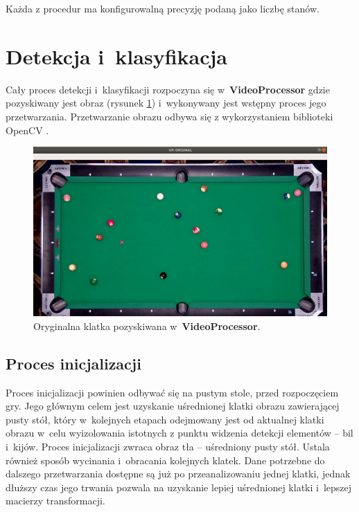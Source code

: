 \documentclass[12pt]{article}
\begin{document}
Każda z procedur ma konfigurowalną precyzję podaną jako liczbę stanów.

\section{Detekcja i~klasyfikacja}

Cały proces detekcji i~klasyfikacji rozpoczyna się w~\textbf{VideoProcessor} gdzie pozyskiwany jest obraz (rysunek \ref{vp_original}) i~wykonywany jest wstępny proces jego przetwarzania. Przetwarzanie obrazu odbywa się z wykorzystaniem biblioteki OpenCV \cite{OpenCV}.

\begin{figure}[!htb]
    \centering
    \includegraphics[width=15cm]{./images/obrazki/vp/original.png}
    \caption{Oryginalna klatka pozyskiwana w~\textbf{VideoProcessor}.}
    \label{vp_original}
\end{figure}

\subsection{Proces inicjalizacji}

Proces inicjalizacji powinien odbywać się na pustym stole, przed rozpoczęciem gry. Jego głównym celem jest uzyskanie uśrednionej klatki obrazu zawierającej pusty stół, który w~kolejnych etapach odejmowany jest od aktualnej klatki obrazu w~celu wyizolowania istotnych z punktu widzenia detekcji elementów – bil i~kijów. Proces inicjalizacji zwraca obraz tła – uśredniony pusty stół. Ustala również sposób wycinania i~obracania kolejnych klatek. Dane potrzebne do dalszego przetwarzania dostępne są już po przeanalizowaniu jednej klatki, jednak dłuższy czas jego trwania pozwala na uzyskanie lepiej uśrednionej klatki i~lepszej macierzy transformacji. 
\clearpage
\end{document}

